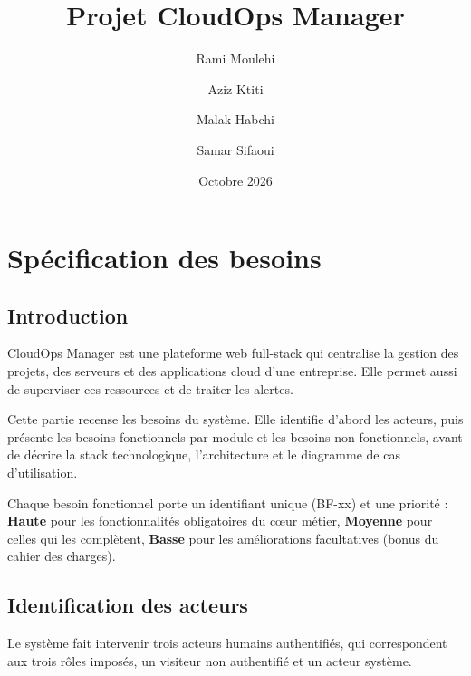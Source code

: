 \documentclass[11pt,a4paper]{article}
\title{Projet CloudOps Manager}
\author{Rami Moulehi \and Aziz Ktiti \and Malak Habchi \and Samar Sifaoui}
\date{Octobre 2026}
\begin{document}
\maketitle
\tableofcontents
\newpage

\section{Spécification des besoins}

\subsection{Introduction}

CloudOps Manager est une plateforme web full-stack qui centralise la gestion des
projets, des serveurs et des applications cloud d'une entreprise. Elle permet aussi
de superviser ces ressources et de traiter les alertes.

Cette partie recense les besoins du système. Elle identifie d'abord les acteurs,
puis présente les besoins fonctionnels par module et les besoins non fonctionnels,
avant de décrire la stack technologique, l'architecture et le diagramme de cas d'utilisation.

Chaque besoin fonctionnel porte un identifiant unique (BF-xx) et une priorité :
\textbf{Haute} pour les fonctionnalités obligatoires du cœur métier,
\textbf{Moyenne} pour celles qui les complètent, \textbf{Basse} pour les
améliorations facultatives (bonus du cahier des charges).

\subsection{Identification des acteurs}

Le système fait intervenir trois acteurs humains authentifiés, qui correspondent aux
trois rôles imposés, un visiteur non authentifié et un acteur système.
\end{document}
